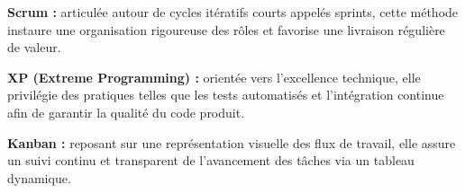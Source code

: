 \textbullet \hspace{0.2cm} \textbf{ Scrum : }articulée autour de cycles itératifs courts appelés sprints, cette méthode instaure une organisation rigoureuse des rôles et favorise une livraison régulière de valeur.

\textbullet \hspace{0.2cm} \textbf{XP (Extreme Programming) :} orientée vers l'excellence technique, elle privilégie des pratiques telles que les tests automatisés et l'intégration continue afin de garantir la qualité du code produit.

\textbullet \hspace{0.2cm} \textbf{Kanban :} reposant sur une représentation visuelle des flux de travail, elle assure un suivi continu et transparent de l'avancement des tâches via un tableau dynamique.


